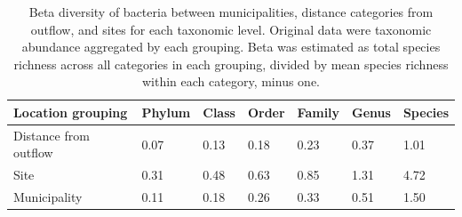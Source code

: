 \documentclass[letterpaper,12pt]{article}\usepackage[]{graphicx}\usepackage[]{color}
\begin{document}
\begin{table}[!tbp]
\caption{Beta diversity of bacteria between municipalities, distance categories from outflow, and sites for each taxonomic level.  Original data were taxonomic abundance aggregated by each grouping.  Beta was estimated as total species richness across all categories in each grouping, divided by mean species richness within each category, minus one.\label{tab:beta_bac}} 
\begin{center}
\begin{tabular}{lllllll}
\hline\hline
\multicolumn{1}{l}{Location grouping}&\multicolumn{1}{c}{Phylum}&\multicolumn{1}{c}{Class}&\multicolumn{1}{c}{Order}&\multicolumn{1}{c}{Family}&\multicolumn{1}{c}{Genus}&\multicolumn{1}{c}{Species}\tabularnewline
\hline
Distance from outflow&0.07&0.13&0.18&0.23&0.37&1.01\tabularnewline
Site&0.31&0.48&0.63&0.85&1.31&4.72\tabularnewline
Municipality&0.11&0.18&0.26&0.33&0.51&1.50\tabularnewline
\hline
\end{tabular}\end{center}
\end{table}
\end{document}
